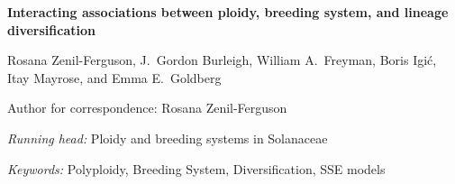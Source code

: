 \documentclass[11pt]{article}
\begin{document}

%
%
%
%

\begin{center}
    \textbf{Interacting associations between ploidy, breeding system, and lineage diversification}
\end{center}

\vfill

\noindent
Rosana Zenil-Ferguson,%
%
\noindent
J.~Gordon Burleigh,%
%
\noindent
William A.~Freyman,%
%
\noindent
Boris Igi\'c,%
%
\noindent
Itay Mayrose,%
%
and
Emma E.~Goldberg%

\vfill

\theendnotes

\noindent
Author for correspondence: Rosana Zenil-Ferguson

\vfill

\noindent
\textit{Running head:} Ploidy and breeding systems in Solanaceae

\vfill

\noindent
\textit{Keywords:} 
Polyploidy,
Breeding System,
Diversification, SSE models

\vfill

\linenumbers


\clearpage


\end{document}
